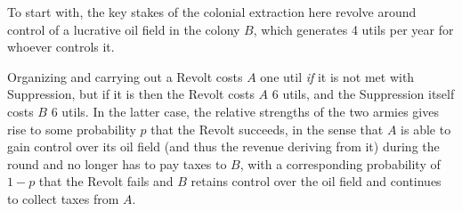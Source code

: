 To start with, the key stakes of the colonial extraction here revolve around control of a lucrative oil field in the colony $B$, which generates 4 utils per year for whoever controls it.

Organizing and carrying out a Revolt costs $A$ one util \textit{if} it is not met with Suppression, but if it is then the Revolt costs $A$ 6 utils, and the Suppression itself costs $B$ 6 utils. In the latter case, the relative strengths of the two armies gives rise to some probability $p$ that the Revolt succeeds, in the sense that $A$ is able to gain control over its oil field (and thus the revenue deriving from it) during the round and no longer has to pay taxes to $B$, with a corresponding probability of $1-p$ that the Revolt fails and $B$ retains control over the oil field and continues to collect taxes from $A$.


